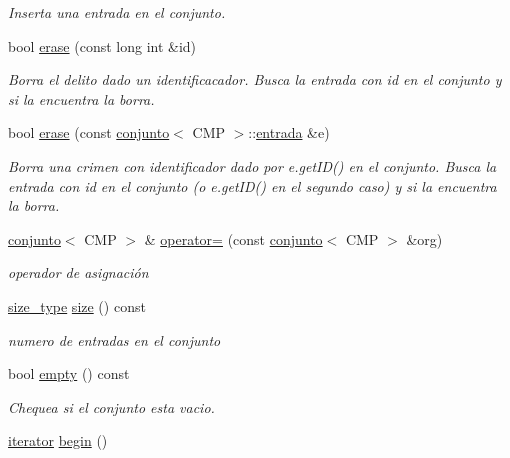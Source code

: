 \begin{DoxyCompactItemize}
\begin{DoxyCompactList}\small\item\em Inserta una entrada en el conjunto. \end{DoxyCompactList}\item 
bool \hyperlink{classconjunto_a92332298c1202e92027b48f01c69ae91}{erase} (const long int \&id)
\begin{DoxyCompactList}\small\item\em Borra el delito dado un identificacador. Busca la entrada con id en el conjunto y si la encuentra la borra. \end{DoxyCompactList}\item 
bool \hyperlink{classconjunto_a4d137b4ba9c3248129c0b49e42a42718}{erase} (const \hyperlink{classconjunto}{conjunto}$<$ C\+M\+P $>$\+::\hyperlink{classconjunto_a7630ace7cb17bcec07daf5804f1a0780}{entrada} \&e)
\begin{DoxyCompactList}\small\item\em Borra una crimen con identificador dado por e.\+get\+I\+D() en el conjunto. Busca la entrada con id en el conjunto (o e.\+get\+I\+D() en el segundo caso) y si la encuentra la borra. \end{DoxyCompactList}\item 
\hyperlink{classconjunto}{conjunto}$<$ C\+M\+P $>$ \& \hyperlink{classconjunto_accd0bbeecfd69cd5fbce17cfe2b7d363}{operator=} (const \hyperlink{classconjunto}{conjunto}$<$ C\+M\+P $>$ \&org)
\begin{DoxyCompactList}\small\item\em operador de asignación \end{DoxyCompactList}\item 
\hyperlink{classconjunto_a0cc9902da62790ec2a6d59f4559c2df5}{size\+\_\+type} \hyperlink{classconjunto_af9962de5f6425f2030dc0e63015f85b3}{size} () const 
\begin{DoxyCompactList}\small\item\em numero de entradas en el conjunto \end{DoxyCompactList}\item 
bool \hyperlink{classconjunto_a904716d6ae739f0461880b08138cf4e4}{empty} () const 
\begin{DoxyCompactList}\small\item\em Chequea si el conjunto esta vacio. \end{DoxyCompactList}\item 
\hypertarget{classconjunto_a9747d18cc29695c016b79cbf65d5ea7f}{}\hyperlink{classconjunto_1_1iterator}{iterator} \hyperlink{classconjunto_a9747d18cc29695c016b79cbf65d5ea7f}{begin} ()\label{classconjunto_a9747d18cc29695c016b79cbf65d5ea7f}


\end{DoxyCompactItemize}
